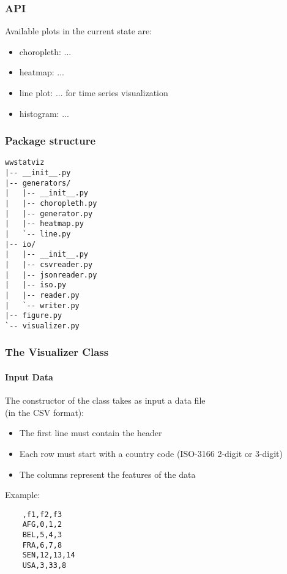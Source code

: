 \begin{frame}
  \frametitle{API}

Available plots in the current state are:
\begin{itemize}
  \item choropleth: ...
  \item heatmap: ...
  \item line plot: ... for time series visualization
  \item histogram: ...
\end{itemize}
\end{frame}

\begin{frame}[fragile,shrink=30]
  \frametitle{Package structure}
\begin{verbatim}
wwstatviz
|-- __init__.py
|-- generators/
|   |-- __init__.py
|   |-- choropleth.py
|   |-- generator.py
|   |-- heatmap.py
|   `-- line.py
|-- io/
|   |-- __init__.py
|   |-- csvreader.py
|   |-- jsonreader.py
|   |-- iso.py
|   |-- reader.py
|   `-- writer.py
|-- figure.py
`-- visualizer.py
\end{verbatim}
\end{frame}

\begin{frame}[fragile,shrink=10]
  \frametitle{The Visualizer Class}
  \framesubtitle{Input Data}
  
  The constructor of the class takes as input a data file \\
  (in the CSV format):
  \begin{itemize}
    \item The first line must contain the header
    \item Each row must start with a country code (ISO-3166 2-digit or 3-digit)
    \item The columns represent the features of the data
  \end{itemize}
  
  \vspace{5mm}
  
  Example:
  \begin{verbatim}
    ,f1,f2,f3
    AFG,0,1,2
    BEL,5,4,3
    FRA,6,7,8
    SEN,12,13,14
    USA,3,33,8
  \end{verbatim}

\end{frame}

